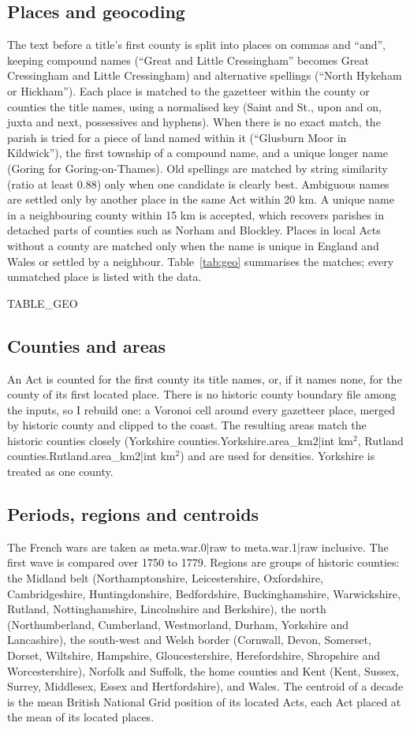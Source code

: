\documentclass[11pt,a4paper]{article}
\begin{document}
\subsection{Places and geocoding}
The text before a title's first county is split into places on commas and ``and'', keeping compound names (``Great and Little Cressingham'' becomes Great Cressingham and Little Cressingham) and alternative spellings (``North Hykeham or Hickham''). Each place is matched to the gazetteer within the county or counties the title names, using a normalised key (Saint and St., upon and on, juxta and next, possessives and hyphens). When there is no exact match, the parish is tried for a piece of land named within it (``Glusburn Moor in Kildwick''), the first township of a compound name, and a unique longer name (Goring for Goring-on-Thames). Old spellings are matched by string similarity (ratio at least 0.88) only when one candidate is clearly best. Ambiguous names are settled only by another place in the same Act within 20 km. A unique name in a neighbouring county within 15 km is accepted, which recovers parishes in detached parts of counties such as Norham and Blockley. Places in local Acts without a county are matched only when the name is unique in England and Wales or settled by a neighbour. Table~\ref{tab:geo} summarises the matches; every unmatched place is listed with the data.

{{TABLE_GEO}}

\subsection{Counties and areas}
An Act is counted for the first county its title names, or, if it names none, for the county of its first located place. There is no historic county boundary file among the inputs, so I rebuild one: a Voronoi cell around every gazetteer place, merged by historic county and clipped to the coast. The resulting areas match the historic counties closely (Yorkshire {{counties.Yorkshire.area_km2|int}} km$^2$, Rutland {{counties.Rutland.area_km2|int}} km$^2$) and are used for densities. Yorkshire is treated as one county.

\subsection{Periods, regions and centroids}
The French wars are taken as {{meta.war.0|raw}} to {{meta.war.1|raw}} inclusive. The first wave is compared over 1750 to 1779. Regions are groups of historic counties: the Midland belt (Northamptonshire, Leicestershire, Oxfordshire, Cambridgeshire, Huntingdonshire, Bedfordshire, Buckinghamshire, Warwickshire, Rutland, Nottinghamshire, Lincolnshire and Berkshire), the north (Northumberland, Cumberland, Westmorland, Durham, Yorkshire and Lancashire), the south-west and Welsh border (Cornwall, Devon, Somerset, Dorset, Wiltshire, Hampshire, Gloucestershire, Herefordshire, Shropshire and Worcestershire), Norfolk and Suffolk, the home counties and Kent (Kent, Sussex, Surrey, Middlesex, Essex and Hertfordshire), and Wales. The centroid of a decade is the mean British National Grid position of its located Acts, each Act placed at the mean of its located places.
\end{document}
